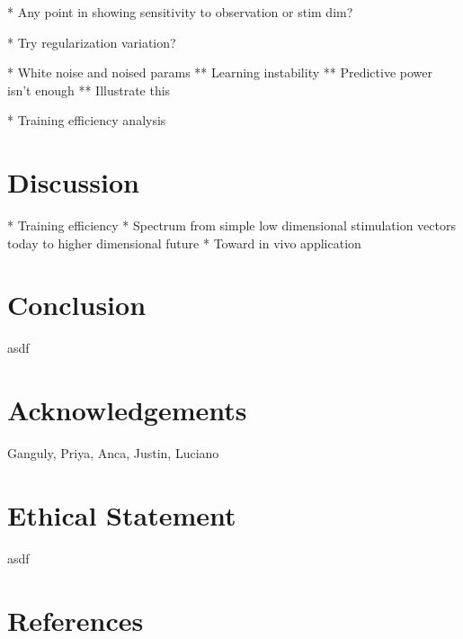 \documentclass[12pt]{iopart}
\begin{document}
* Any point in showing sensitivity to observation or stim dim?

* Try regularization variation?

* White noise and noised params
** Learning instability
** Predictive power isn't enough
** Illustrate this

* Training efficiency analysis

\section{Discussion}
* Training efficiency
* Spectrum from simple low dimensional stimulation vectors today to higher dimensional future
* Toward in vivo application

\section{Conclusion}
asdf

\section{Acknowledgements}
Ganguly, Priya, Anca, Justin, Luciano

\section{Ethical Statement}
asdf

\section{References}


\end{document}
